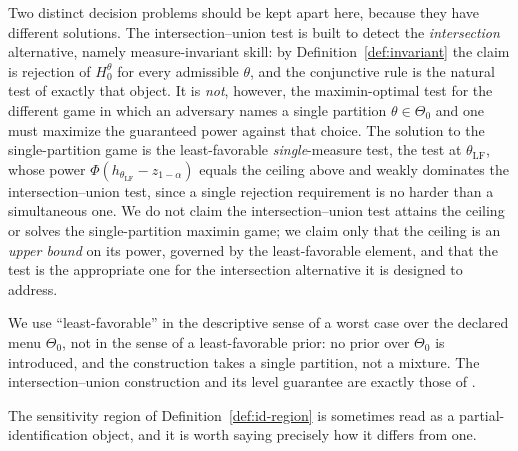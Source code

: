 \documentclass[preprint,12pt]{elsarticle}
\theoremstyle{definition}
\begin{document}
Two distinct decision problems should be kept apart here, because they have
different solutions. The intersection--union test is built to detect the
\emph{intersection} alternative, namely measure-invariant skill: by
Definition~\ref{def:invariant} the claim is rejection of $H_0^\theta$ for every
admissible $\theta$, and the conjunctive rule is the natural test of exactly that
object. It is \emph{not}, however, the maximin-optimal test for the different game
in which an adversary names a single partition $\theta\in\Theta_0$ and one must
maximize the guaranteed power against that choice. The solution to the
single-partition game is the least-favorable \emph{single}-measure test, the test
at $\theta_{\mathrm{LF}}$, whose power $\Phi(h_{\theta_{\mathrm{LF}}}-z_{1-\alpha})$
equals the ceiling above and weakly dominates the intersection--union test, since a
single rejection requirement is no harder than a simultaneous one. We do not claim
the intersection--union test attains the ceiling or solves the single-partition
maximin game; we claim only that the ceiling is an \emph{upper bound} on its power,
governed by the least-favorable element, and that the test is the appropriate one
for the intersection alternative it is designed to address.

We use ``least-favorable'' in the descriptive sense of a worst case over the
declared menu $\Theta_0$, not in the sense of a least-favorable prior: no prior over
$\Theta_0$ is introduced, and the construction takes a single partition, not a
mixture. The intersection--union construction and its level guarantee are exactly
those of \cite{LehmannRomano2005}.

The sensitivity region of Definition~\ref{def:id-region} is sometimes read as a
partial-identification object, and it is worth saying precisely how it differs from
one.
\end{document}
